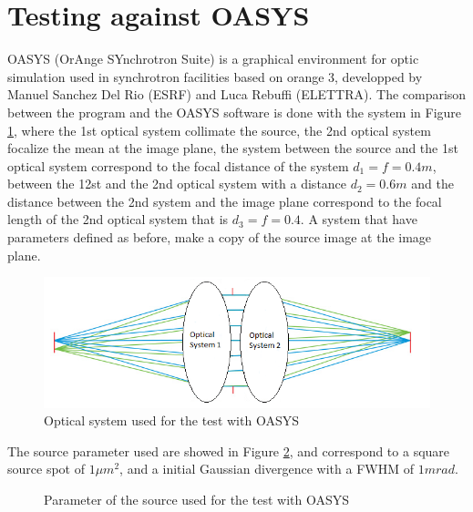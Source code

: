 \section{Testing against OASYS}
%
OASYS (OrAnge SYnchrotron Suite) is a graphical environment for optic simulation used in synchrotron facilities based on orange 3, developped by Manuel Sanchez Del Rio (ESRF) and Luca Rebuffi (ELETTRA).
The comparison between the program and the OASYS software is done with the system in Figure \ref{fig: Optical system}, where the 1st optical system collimate the source, the 2nd optical system focalize the mean at the image plane, the system between the source and the 1st optical system correspond to the focal distance of the system $d_1 = f = 0.4 m $, between the 12st and the 2nd optical system with a distance $d_2 = 0.6 m $ and the distance between the 2nd system and the image plane correspond to the focal length of the 2nd optical system that is $d_3 = f = 0.4$. A system that have parameters defined as before, make a copy of the source image at the image plane.
%
\begin{figure}[]
%
\centering
%
\includegraphics[width=.6\textwidth]{Immagini/Chapter4/OpticalSystems}
%
\caption{Optical system used for the test with OASYS}
%
\label{fig: Optical system}
%
\end{figure}
%
The source parameter used are showed in Figure \ref{fig: Source Parameter for OASYS}, and correspond to  a square source spot of $1 \mu m^2 $, and a initial Gaussian divergence with a FWHM of $1 mrad $.
\begin{figure}[]
%
\centering
%
%
%
\caption{Parameter of the source used for the test with OASYS}
%
\label{fig: Source Parameter for OASYS}
%
\end{figure}
